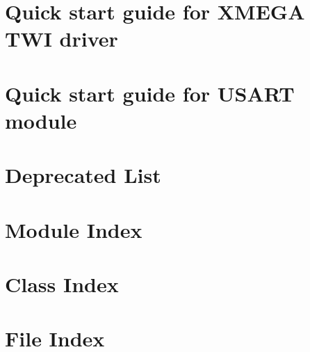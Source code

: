 \documentclass{book}
\begin{document}
\chapter{Quick start guide for X\-M\-E\-G\-A T\-W\-I driver}
\label{xmega_twi_quickstart}
\hypertarget{xmega_twi_quickstart}{}

\chapter{Quick start guide for U\-S\-A\-R\-T module}
\label{xmega_usart_quickstart}
\hypertarget{xmega_usart_quickstart}{}

\chapter{Deprecated List}
\label{deprecated}
\hypertarget{deprecated}{}

\chapter{Module Index}

\chapter{Class Index}

\chapter{File Index}

\end{document}
